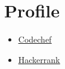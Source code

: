 \documentclass[letterpaper,11pt]{article}
\newcommand{\resumeItem}[1]{
  \item\small{
    {#1 \vspace{-2pt}}
  }
}
\newcommand{\resumeItemListStart}{\begin{itemize}}
\newcommand{\resumeItemListEnd}{\end{itemize}\vspace{-5pt}}
\begin{document}
  \section{Profile}
 \begin{itemize}[leftmargin=0.15in, label={}]
            \resumeItemListStart
            
            \resumeItem{\href{https://www.codechef.com/users/tannu_kumari}{\underline{Codechef}}}
            \resumeItem{\href{https://www.hackerrank.com/tannuchoudhary10}{\underline{Hackerrank}}}
            
            
          \resumeItemListEnd
 \end{itemize}
\end{document}
